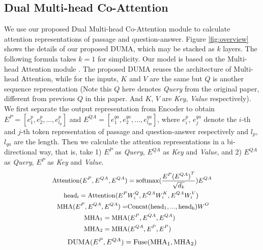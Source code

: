 \documentclass[letterpaper]{article} \usepackage{aaai21}  \usepackage{times}  \usepackage{helvet} \usepackage{courier}  \usepackage[hyphens]{url}  \usepackage{graphicx} \urlstyle{rm} \def\UrlFont{\rm}  \usepackage{natbib}  \usepackage{caption} \frenchspacing  \setlength{\pdfpagewidth}{8.5in}  \setlength{\pdfpageheight}{11in}
\begin{document}
\subsection{Dual Multi-head Co-Attention}



We use our proposed Dual Multi-head Co-Attention module to calculate attention representations of passage and question-answer. Figure \ref{fig:overview} shows the details of our proposed DUMA, which may be stacked as $k$ layers. The following formula takes $k=1$ for simplicity. Our model is based on the Multi-head Attention module \cite{transformer}. The proposed DUMA reuses the architecture of Multi-head Attention, while for the inputs, $K$ and $V$ are the same but $Q$ is another sequence representation (Note this $Q$ here denotes \textit{Query} from the original paper, different from previous $Q$ in this paper. And $K$, $V$ are \textit{Key}, \textit{Value} respectively). We first separate the output representation from Encoder to obtain $E^P = [e_{1}^p, e_{2}^p, ..., e_{l_{p}}^p]$ and $E^{QA} = [e_{1}^{qa}, e_{2}^{qa}, ..., e_{l_{qa}}^{qa}]$, where $e_{i}^p$, $e_{j}^{qa}$ denote the $i$-th and $j$-th token representation of passage and question-answer respectively and $l_p$, $l_{qa}$ are the length. Then we calculate the attention representations in a bi-directional way, that is, take 1) $E^P$ as \textit{Query}, $E^{QA}$ as \textit{Key} and \textit{Value}, and 2) $E^{QA}$ as \textit{Query}, $E^{P}$ as \textit{Key} and \textit{Value}.
\begin{equation}\small
	\begin{split}
	{\rm Attention}(E^P,E^{QA},E^{QA})&={\rm softmax}(\frac{E^P{(E^{QA})}^T}{\sqrt{d_k}})E^{QA}\\
	{\rm head_i} = {\rm Attention}(E^P&W_i^Q, E^{QA}W_i^K, E^{QA}W_i^V) \\
	{\rm MHA}(E^P,E^{QA},E^{QA})=&{\rm Concat}({\rm head_1}, ..., {\rm head_h})W^O \\
	{\rm MHA_1=MHA}&(E^P, E^{QA}, E^{QA}) \\
	{\rm MHA_2=MHA}&(E^{QA}, E^P, E^P) \nonumber
	\end{split}
\end{equation}
\begin{equation}\small
	{\rm DUMA}(E^P,E^{QA}) = {\rm Fuse}(\rm {MHA_1, MHA_2})\label{eq_fuse}\\ 
\end{equation}
\end{document}
